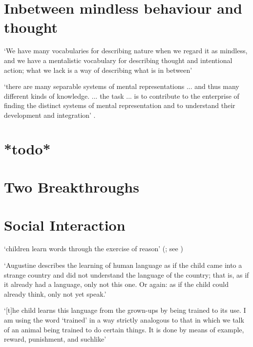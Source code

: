 \documentclass[12pt]{extarticle}
\begin{document}
\begin{multicols}{3}
 
 
\section{Inbetween mindless behaviour and thought}
 
‘We have many vocabularies for describing nature when we regard it as mindless, and we have a mentalistic vocabulary for describing thought and intentional action; what we lack is a way of describing what is in between’ \citep[p.\ 11]{Davidson:1999ju}
 
‘there are many separable systems of mental representations ... and thus many different kinds of knowledge. ... the task ... is to contribute to the enterprise of finding the distinct systems of mental representation and to understand their development and integration’
\citep[p.\ 1522]{Hood:2000bf}.
 
 
 
\section{*todo*}
 
 
 
\section{Two Breakthroughs}
 
 
 
\section{Social Interaction}
 
‘children learn words through the exercise of reason’
(\citealp[p.\ 1103]{Bloom:2001ka}; see \citealp{Bloom:2000qz})
 
‘Augustine describes the learning of human language as if the child came into a strange country and did not understand the language of the country; that is, as if it already had a language, only not this one. Or again: as if the child could already think, only not yet speak.’
\citep[15--16, §32]{Wittgenstein:1953mm}
 
‘[t]he child learns this language from the grown-ups by being trained to its use. I am using the word ‘trained’ in a way strictly analogous to that in which we talk of an animal being trained to do certain things. It is done by means of example, reward, punishment, and suchlike’
\citep[p.\ 77]{Wittgenstein:1972lj}
 

\end{multicols}
\end{document}
